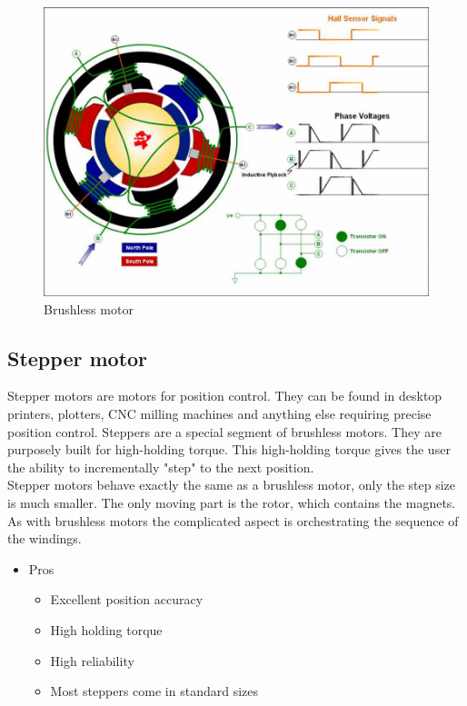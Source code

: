 \documentclass[11pt]{article}
\begin{document}
\begin{figure}[hbtp]
\caption{Brushless motor}
\centering
\includegraphics[scale=0.35]{build/brushless.png}
\end{figure}



\newpage


	\subsection{Stepper motor}
Stepper motors are  motors for position control. They can be found in desktop printers, plotters, CNC milling machines  and anything else requiring precise position control. Steppers are a special segment of brushless motors. They are purposely built for high-holding torque. This high-holding torque gives the user the ability to incrementally "step" to the next position. \\

Stepper motors behave exactly the same as a brushless motor, only the step size is much smaller. The only moving part is  the rotor, which contains the magnets. As with brushless motors the complicated aspect is orchestrating the sequence of the windings. 

\begin{itemize}		
\item Pros
\begin{itemize}
		\item Excellent position accuracy
		\item   High holding torque
		\item  High reliability
		\item   Most steppers come in standard sizes
	\end{itemize}		
\end{itemize}	 
 	
\end{document}
